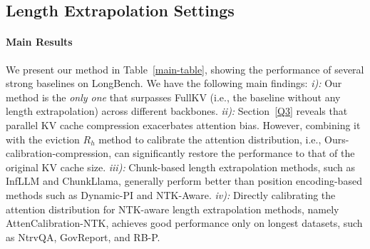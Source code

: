 




\subsection{Length Extrapolation Settings}
\paragraph{Main Results} We present our method in Table~\ref{main-table}, showing the performance of several strong baselines on LongBench. We have the following main findings: \textit{i):} Our method is the \textit{only one} that surpasses FullKV (i.e., the baseline without any length extrapolation) across different backbones. \textit{ii):} Section~\ref{Q3} reveals that parallel KV cache compression exacerbates attention bias. However, combining it with the eviction \(R_h\) method to calibrate the attention distribution, i.e., Ours-calibration-compression, can significantly restore the performance to that of the original KV cache size. \textit{iii):} Chunk-based length extrapolation methods, such as InfLLM and ChunkLlama, generally perform better than position encoding-based methods such as Dynamic-PI and NTK-Aware. \textit{iv):} Directly calibrating the attention distribution for NTK-aware length extrapolation methods, namely AttenCalibration-NTK, achieves good performance only on longest datasets, such as NtrvQA, GovReport, and RB-P.

